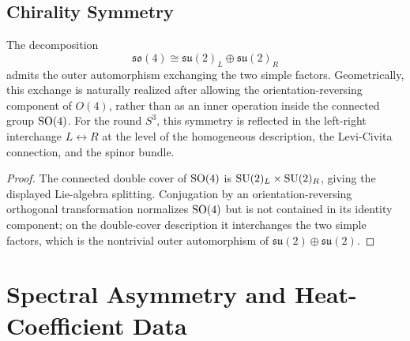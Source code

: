 \documentclass[11pt]{article}
\begin{document}
\subsection{Chirality Symmetry}
\label{p1:der:chirality-symmetry}
\begin{proposition}
\label{p1:prop:chirality-factor-exchange}
The decomposition
\[
\mathfrak{so}(4)\cong \mathfrak{su}(2)_L\oplus \mathfrak{su}(2)_R
\]
admits the outer automorphism exchanging the two simple factors. Geometrically, this exchange is naturally realized after allowing the orientation-reversing component of \(O(4)\), rather than as an inner operation inside the connected group \(\mathrm{SO}(4)\). For the round \(S^3\), this symmetry is reflected in the left-right interchange \(L\leftrightarrow R\) at the level of the homogeneous description, the Levi-Civita connection, and the spinor bundle.
\end{proposition}

\begin{proof}
The connected double cover of \(\mathrm{SO}(4)\) is \(\mathrm{SU}(2)_L\times\mathrm{SU}(2)_R\), giving the displayed Lie-algebra splitting.  Conjugation by an orientation-reversing orthogonal transformation normalizes \(\mathrm{SO}(4)\) but is not contained in its identity component; on the double-cover description it interchanges the two simple factors, which is the nontrivial outer automorphism of \(\mathfrak{su}(2)\oplus\mathfrak{su}(2)\).
\end{proof}


\section{Spectral Asymmetry and Heat-Coefficient Data}
\label{p1:sec:advanced-topological}
\end{document}
